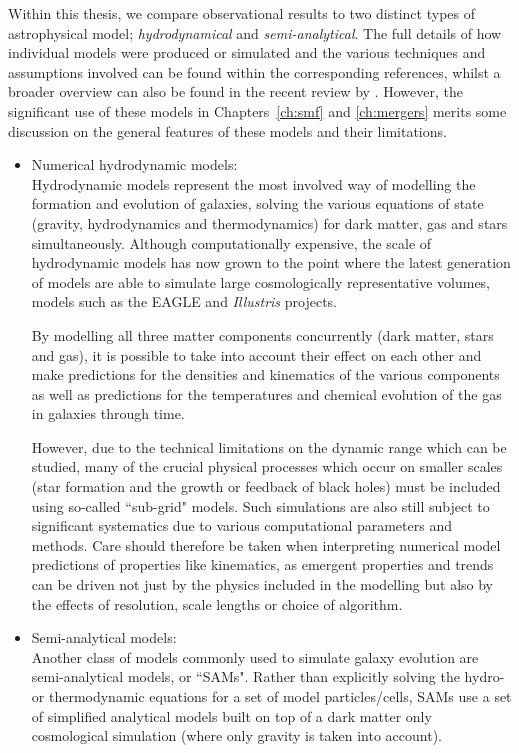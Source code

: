 Within this thesis, we compare observational results to two distinct types of astrophysical model; \emph{hydrodynamical} and \emph{semi-analytical}. The full details of how individual models were produced or simulated and the various techniques and assumptions involved can be found within the corresponding references, whilst a broader overview can also be found in the recent review by \citet{Somerville:2014un}. However, the significant use of these models in Chapters~\ref{ch:smf} and \ref{ch:mergers} merits some discussion on the general features of these models and their limitations.

\begin{itemize}
	\item Numerical hydrodynamic models: \\
	Hydrodynamic models represent the most involved way of modelling the formation and evolution of galaxies, solving the various equations of state (gravity, hydrodynamics and thermodynamics) for dark matter, gas and stars simultaneously. Although computationally expensive, the scale of hydrodynamic models has now grown to the point where the latest generation of models are able to simulate large cosmologically representative volumes, models such as the EAGLE \citep{Schaye:2014gk} and \emph{Illustris} \citep{Vogelsberger:2014gw} projects. 
	
	By modelling all three matter components concurrently (dark matter, stars and gas), it is possible to take into account their effect on each other and make predictions for the densities and kinematics of the various components as well as predictions for the temperatures and chemical evolution of the gas in galaxies through time. 
	
	However, due to the technical limitations on the dynamic range which can be studied, many of the crucial physical processes which occur on smaller scales (star formation and the growth or feedback of black holes) must be included using so-called ``sub-grid" models. Such simulations are also still subject to significant systematics due to various computational parameters and methods. Care should therefore be taken when interpreting numerical model predictions of properties like kinematics, as emergent properties and trends can be driven not just by the physics included in the modelling but also by the effects of resolution, scale lengths or choice of algorithm.
		
	\item Semi-analytical models: \\
		Another class of models commonly used to simulate galaxy evolution are semi-analytical models, or ``SAMs". Rather than explicitly solving the hydro- or thermodynamic equations for a set of model particles/cells, SAMs use a set of simplified analytical models built on top of a dark matter only cosmological simulation (where only gravity is taken into account).
		

\end{itemize}
